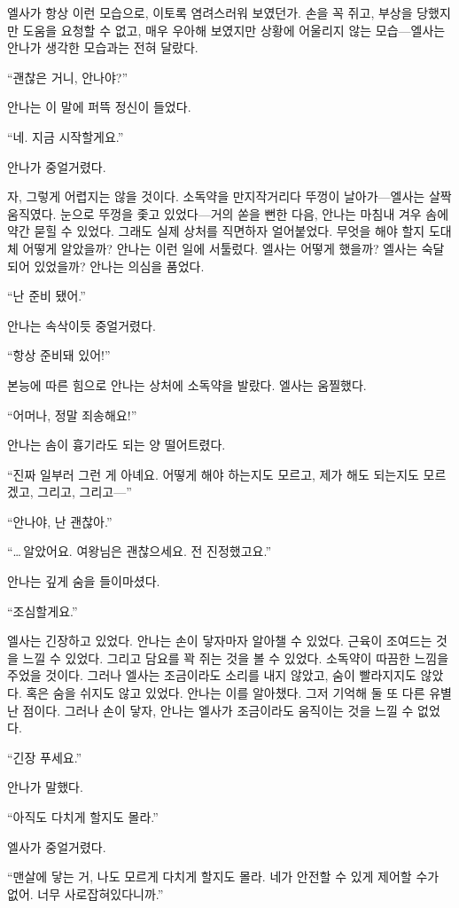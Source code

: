 엘사가 항상 이런 모습으로, 이토록 염려스러워 보였던가. 손을 꼭 쥐고, 부상을 당했지만 도움을 요청할 수 없고, 매우 우아해 보였지만 상황에 어울리지 않는 모습—엘사는 안나가 생각한 모습과는 전혀 달랐다.

``괜찮은 거니, 안나야?''

안나는 이 말에 퍼뜩 정신이 들었다.

``네. 지금 시작할게요.''

안나가 중얼거렸다.

자, 그렇게 어렵지는 않을 것이다. 소독약을 만지작거리다 뚜껑이 날아가—엘사는 살짝 움직였다. 눈으로 뚜껑을 좇고 있었다—거의 쏟을 뻔한 다음, 안나는 마침내 겨우 솜에 약간 묻힐 수 있었다. 그래도 실제 상처를 직면하자 얼어붙었다. 무엇을 해야 할지 도대체 어떻게 알았을까? 안나는 이런 일에 서툴렀다. 엘사는 어떻게 했을까? 엘사는 숙달되어 있었을까? 안나는 의심을 품었다.

``난 준비 됐어.''

안나는 속삭이듯 중얼거렸다.

``항상 준비돼 있어!''

본능에 따른 힘으로 안나는 상처에 소독약을 발랐다. 엘사는 움찔했다.

``어머나, 정말 죄송해요!''

안나는 솜이 흉기라도 되는 양 떨어트렸다.

``진짜 일부러 그런 게 아녜요. 어떻게 해야 하는지도 모르고, 제가 해도 되는지도 모르겠고, 그리고, 그리고—''

``안나야, 난 괜찮아.''

``\ldots\,알았어요. 여왕님은 괜찮으세요. 전 진정했고요.''

안나는 깊게 숨을 들이마셨다.

``조심할게요.''

엘사는 긴장하고 있었다. 안나는 손이 닿자마자 알아챌 수 있었다. 근육이 조여드는 것을 느낄 수 있었다. 그리고 담요를 꽉 쥐는 것을 볼 수 있었다. 소독약이 따끔한 느낌을 주었을 것이다. 그러나 엘사는 조금이라도 소리를 내지 않았고, 숨이 빨라지지도 않았다. 혹은 숨을 쉬지도 않고 있었다. 안나는 이를 알아챘다. 그저 기억해 둘 또 다른 유별난 점이다. 그러나 손이 닿자, 안나는 엘사가 조금이라도 움직이는 것을 느낄 수 없었다.

``긴장 푸세요.''

안나가 말했다.

``아직도 다치게 할지도 몰라.''

엘사가 중얼거렸다.

``맨살에 닿는 거, 나도 모르게 다치게 할지도 몰라. 네가 안전할 수 있게 제어할 수가 없어. 너무 사로잡혀있다니까.''

